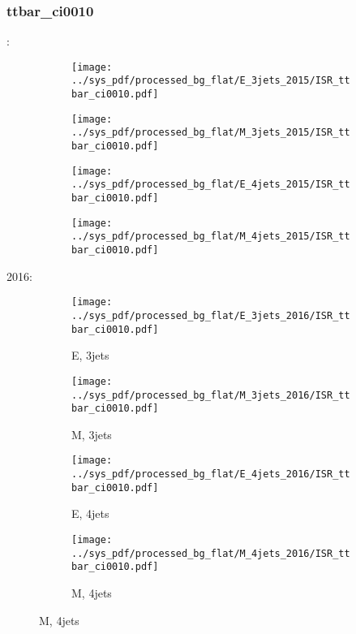 \documentclass{beamer}
\begin{document}
\begin{frame}
\frametitle{ttbar_ci0010}
\fontsize{5}{1}:
\begin{figure}
\centering
\begin{subfigure}[b]{0.24\textwidth}
\texttt{[image: ../sys\_pdf/processed\_bg\_flat/E\_3jets\_2015/ISR\_ttbar\_ci0010.pdf]}
\end{subfigure}
\begin{subfigure}[b]{0.24\textwidth}
\texttt{[image: ../sys\_pdf/processed\_bg\_flat/M\_3jets\_2015/ISR\_ttbar\_ci0010.pdf]}
\end{subfigure}
\begin{subfigure}[b]{0.24\textwidth}
\texttt{[image: ../sys\_pdf/processed\_bg\_flat/E\_4jets\_2015/ISR\_ttbar\_ci0010.pdf]}
\end{subfigure}
\begin{subfigure}[b]{0.24\textwidth}
\texttt{[image: ../sys\_pdf/processed\_bg\_flat/M\_4jets\_2015/ISR\_ttbar\_ci0010.pdf]}
\end{subfigure}
\end{figure}
2016:
\begin{figure}
\centering
\begin{subfigure}[b]{0.24\textwidth}
\texttt{[image: ../sys\_pdf/processed\_bg\_flat/E\_3jets\_2016/ISR\_ttbar\_ci0010.pdf]}
\captionsetup{font=tiny}
\caption{E, 3jets}
\end{subfigure}
\begin{subfigure}[b]{0.24\textwidth}
\texttt{[image: ../sys\_pdf/processed\_bg\_flat/M\_3jets\_2016/ISR\_ttbar\_ci0010.pdf]}
\captionsetup{font=tiny}
\caption{M, 3jets}
\end{subfigure}
\begin{subfigure}[b]{0.24\textwidth}
\texttt{[image: ../sys\_pdf/processed\_bg\_flat/E\_4jets\_2016/ISR\_ttbar\_ci0010.pdf]}
\captionsetup{font=tiny}
\caption{E, 4jets}
\end{subfigure}
\begin{subfigure}[b]{0.24\textwidth}
\texttt{[image: ../sys\_pdf/processed\_bg\_flat/M\_4jets\_2016/ISR\_ttbar\_ci0010.pdf]}
\captionsetup{font=tiny}
\caption{M, 4jets}
\end{subfigure}
\end{figure}
\end{frame}
\end{document}
